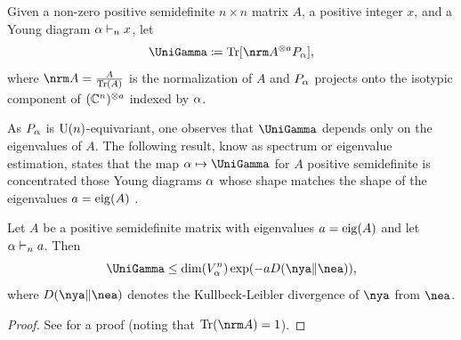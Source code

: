 \documentclass[notitlepage, 10pt]{article}
\begin{document}
\begin{defn}
    Given a non-zero positive semidefinite $n \times n$ matrix $A$, a positive integer $x$, and a Young diagram $\alpha \vdash_n x$, let
    \begin{equation}
        \UniGamma
        \coloneqq \Tr[\nrm A^{\ot a} P_{\ya}],
    \end{equation}
    where $\nrm A = \frac{A}{\Tr(A)}$ is the normalization of $A$ and $P_{\alpha}$ projects onto the isotypic component of $(\mathbb C^n)^{\otimes a}$ indexed by $\alpha$.
\end{defn}
As $P_{\alpha}$ is $\operatorname{U}(n)$-equivariant, one observes that $\UniGamma$ depends only on the eigenvalues of $A$.
The following result, know as spectrum or eigenvalue estimation, states that the map $\ya \mapsto \UniGamma$ for $A$ positive semidefinite is concentrated those Young diagrams $\alpha$ whose shape matches the shape of the eigenvalues $a = \operatorname{eig}(A)$ \cite{alicki1988symmetry,keyl2001estimating,hayashi2002quantum}.
\begin{prop}
    \label{prop:eig_est}
    Let $A$ be a positive semidefinite matrix with eigenvalues $a = \operatorname{eig}(A)$ and let $\alpha \vdash_n a$.
    Then
    \begin{equation}
        \UniGamma \leq \dim(V_{\ya}^{n}) \exp(-a \kl{\nya}{\nea}),
    \end{equation}
    where $\kl{\nya}{\nea}$ denotes the Kullbeck-Leibler divergence of $\nya$ from $\nea$.
\end{prop}
\begin{proof}
    See \cite{keyl2001estimating} for a proof (noting that $\Tr(\nrm A) = 1$).
\end{proof}
\end{document}
